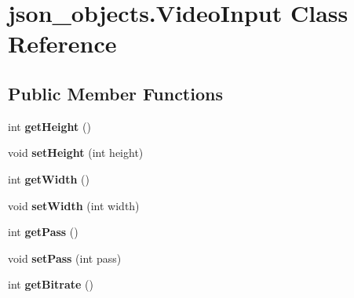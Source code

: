 \hypertarget{classjson__objects_1_1_video_input}{
\section{json\_\-objects.VideoInput Class Reference}
\label{classjson__objects_1_1_video_input}
}
\subsection*{Public Member Functions}
\begin{DoxyCompactItemize}
\item 
\hypertarget{classjson__objects_1_1_video_input_a100b0e7aa801cc0a29c38148e92ea020}{
int {\bfseries getHeight} ()}
\label{classjson__objects_1_1_video_input_a100b0e7aa801cc0a29c38148e92ea020}

\item 
\hypertarget{classjson__objects_1_1_video_input_a726f4bac1e1cf1b7b1d2cde1f9707957}{
void {\bfseries setHeight} (int height)}
\label{classjson__objects_1_1_video_input_a726f4bac1e1cf1b7b1d2cde1f9707957}

\item 
\hypertarget{classjson__objects_1_1_video_input_aa12c986c39e5a0837de99a5054f0fa7e}{
int {\bfseries getWidth} ()}
\label{classjson__objects_1_1_video_input_aa12c986c39e5a0837de99a5054f0fa7e}

\item 
\hypertarget{classjson__objects_1_1_video_input_a001609c62e29388e75fc83d44f2118a6}{
void {\bfseries setWidth} (int width)}
\label{classjson__objects_1_1_video_input_a001609c62e29388e75fc83d44f2118a6}

\item 
\hypertarget{classjson__objects_1_1_video_input_aea6f7e6b2a1480bdd36cc387d98428f0}{
int {\bfseries getPass} ()}
\label{classjson__objects_1_1_video_input_aea6f7e6b2a1480bdd36cc387d98428f0}

\item 
\hypertarget{classjson__objects_1_1_video_input_ac33543a2ec9a6ab7f063935fa983e46d}{
void {\bfseries setPass} (int pass)}
\label{classjson__objects_1_1_video_input_ac33543a2ec9a6ab7f063935fa983e46d}

\item 
\hypertarget{classjson__objects_1_1_video_input_a6210bcc9957fcfa1773272297bd57d52}{
int {\bfseries getBitrate} ()}
\label{classjson__objects_1_1_video_input_a6210bcc9957fcfa1773272297bd57d52}


\end{DoxyCompactItemize}
